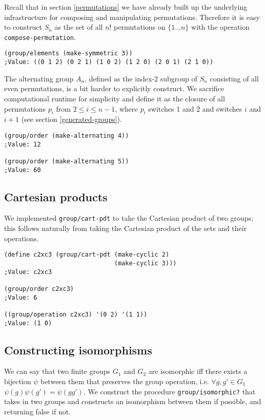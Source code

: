 \documentclass{article}
\begin{document}
        Recall that in section \ref{permutations} we have already built up the underlying infrastructure for composing and manipulating permutations. Therefore it is easy to construct $S_n$ as the set of all $n!$ permutations on $\{1\ldots n\}$ with the operation \texttt{compose-permutation}.

\begin{verbatim}
(group/elements (make-symmetric 3))
;Value: ((0 1 2) (0 2 1) (1 0 2) (1 2 0) (2 0 1) (2 1 0))
\end{verbatim}        

		The alternating group $A_n$, defined as the index-2 subgroup of $S_n$ consisting of all even permutations, is a bit harder to explicitly construct. We sacrifice computational runtime for simplicity and define it as the closure of all permutations $p_i$ from $2\leq i \leq n-1$, where $p_i$ switches 1 and 2 and switches $i$ and $i+1$ (see section \ref{generated-groups}).
		
\begin{verbatim}
(group/order (make-alternating 4))
;Value: 12

(group/order (make-alternating 5))
;Value: 60
\end{verbatim}
    
    	\subsection{Cartesian products}
	
		We implemented \texttt{group/cart-pdt} to take the Cartesian product of two groups; this follows naturally from taking the Cartesian product of the sets and their operations.
		
\begin{verbatim}
(define c2xc3 (group/cart-pdt (make-cyclic 2)
			                  (make-cyclic 3)))
;Value: c2xc3

(group/order c2xc3)
;Value: 6

((group/operation c2xc3) '(0 2) '(1 1))
;Value: (1 0)
\end{verbatim}
    
    	\subsection{Constructing isomorphisms}
	
		We can say that two finite groups $G_1$ and $G_2$ are isomorphic iff there exists a bijection $\psi$ between them that preserves the group operation, i.e. $\forall g, g' \in G_1$ $\psi(g)\psi(g') = \psi(gg')$. We construct the procedure \texttt{group/isomorphic?} that takes in two groups and constructs an isomorphism between them if possible, and returning false if not.
		
\end{document}
